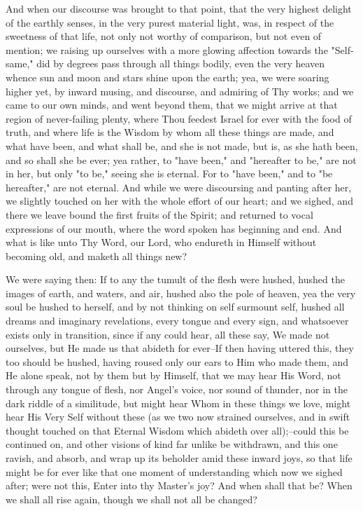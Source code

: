 \documentclass[b5paper,openright,12pt,twoside]{book}
\begin{document}
And when our discourse was brought to that point, that the very highest
delight of the earthly senses, in the very purest material light,
was, in respect of the sweetness of that life, not only not worthy of
comparison, but not even of mention; we raising up ourselves with a more
glowing affection towards the "Self-same," did by degrees pass through
all things bodily, even the very heaven whence sun and moon and stars
shine upon the earth; yea, we were soaring higher yet, by inward musing,
and discourse, and admiring of Thy works; and we came to our own
minds, and went beyond them, that we might arrive at that region of
never-failing plenty, where Thou feedest Israel for ever with the food
of truth, and where life is the Wisdom by whom all these things are
made, and what have been, and what shall be, and she is not made, but
is, as she hath been, and so shall she be ever; yea rather, to "have
been," and "hereafter to be," are not in her, but only "to be," seeing
she is eternal. For to "have been," and to "be hereafter," are not
eternal. And while we were discoursing and panting after her, we
slightly touched on her with the whole effort of our heart; and we
sighed, and there we leave bound the first fruits of the Spirit; and
returned to vocal expressions of our mouth, where the word spoken
has beginning and end. And what is like unto Thy Word, our Lord, who
endureth in Himself without becoming old, and maketh all things new?

We were saying then: If to any the tumult of the flesh were hushed,
hushed the images of earth, and waters, and air, hushed also the pole of
heaven, yea the very soul be hushed to herself, and by not thinking on
self surmount self, hushed all dreams and imaginary revelations, every
tongue and every sign, and whatsoever exists only in transition, since
if any could hear, all these say, We made not ourselves, but He made us
that abideth for ever--If then having uttered this, they too should be
hushed, having roused only our ears to Him who made them, and He alone
speak, not by them but by Himself, that we may hear His Word, not
through any tongue of flesh, nor Angel's voice, nor sound of thunder,
nor in the dark riddle of a similitude, but might hear Whom in these
things we love, might hear His Very Self without these (as we two now
strained ourselves, and in swift thought touched on that Eternal Wisdom
which abideth over all);--could this be continued on, and other visions
of kind far unlike be withdrawn, and this one ravish, and absorb, and
wrap up its beholder amid these inward joys, so that life might be for
ever like that one moment of understanding which now we sighed after;
were not this, Enter into thy Master's joy? And when shall that be? When
we shall all rise again, though we shall not all be changed?
\end{document}
